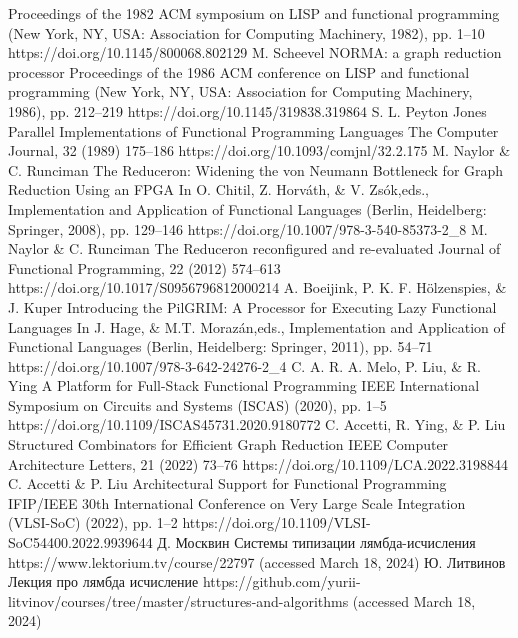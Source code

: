 \documentclass[aspectratio=169]{beamer}
\begin{document}
\begin{frame}[allowframebreaks]
\begin{thebibliography}{}
        Proceedings of the 1982 ACM symposium on LISP and functional programming (New York, NY, USA: Association for Computing Machinery, 1982), pp. 1–10 \newblock https://doi.org/10.1145/800068.802129
        M. Scheevel \newblock
        NORMA: a graph reduction processor \newblock
        Proceedings of the 1986 ACM conference on LISP and functional programming (New York, NY, USA: Association for Computing Machinery, 1986), pp. 212–219 \newblock
        https://doi.org/10.1145/319838.319864
        S. L. Peyton Jones \newblock
        Parallel Implementations of Functional Programming Languages \newblock
        The Computer Journal, 32 (1989) 175–186 \newblock
        https://doi.org/10.1093/comjnl/32.2.175
        M. Naylor \& C. Runciman \newblock
        The Reduceron: Widening the von Neumann Bottleneck for Graph Reduction Using an FPGA \newblock
        In O. Chitil, Z. Horváth, \& V. Zsók,eds., Implementation and Application of Functional Languages (Berlin, Heidelberg: Springer, 2008), pp. 129–146 \newblock
        https://doi.org/10.1007/978-3-540-85373-2\_8
        M. Naylor \& C. Runciman \newblock
        The Reduceron reconfigured and re-evaluated \newblock
        Journal of Functional Programming, 22 (2012) 574–613 \newblock
        https://doi.org/10.1017/S0956796812000214
        A. Boeijink, P. K. F. Hölzenspies, \& J. Kuper \newblock
        Introducing the PilGRIM: A Processor for Executing Lazy Functional Languages \newblock
        In J. Hage, \& M.T. Morazán,eds., Implementation and Application of Functional Languages (Berlin, Heidelberg: Springer, 2011), pp. 54–71 \newblock
        https://doi.org/10.1007/978-3-642-24276-2\_4
        C. A. R. A. Melo, P. Liu, \& R. Ying \newblock
        A Platform for Full-Stack Functional Programming  IEEE International Symposium on Circuits and Systems (ISCAS) (2020), pp. 1–5 \newblock
        https://doi.org/10.1109/ISCAS45731.2020.9180772
        C. Accetti, R. Ying, \& P. Liu \newblock
        Structured Combinators for Efficient Graph Reduction \newblock
        IEEE Computer Architecture Letters, 21 (2022) 73–76 \newblock
        https://doi.org/10.1109/LCA.2022.3198844
        C. Accetti \& P. Liu \newblock
        Architectural Support for Functional Programming  IFIP/IEEE 30th International Conference on Very Large Scale Integration (VLSI-SoC) (2022), pp. 1–2 \newblock
        https://doi.org/10.1109/VLSI-SoC54400.2022.9939644
        Д. Москвин \newblock
        Системы типизации лямбда-исчисления \newblock
        https://www.lektorium.tv/course/22797 (accessed March 18, 2024)
        Ю. Литвинов \newblock
        Лекция про лямбда исчисление \newblock
        https://github.com/yurii-litvinov/courses/tree/master/structures-and-algorithms (accessed March 18, 2024)
    \end{thebibliography}
\end{frame}
\end{document}
